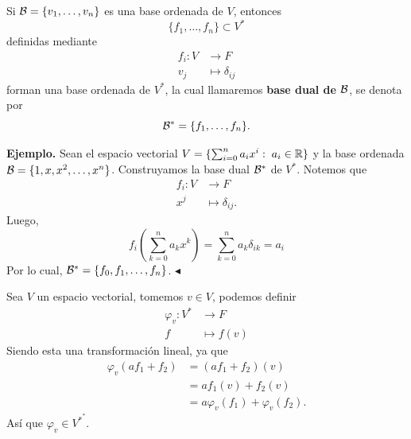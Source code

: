 \documentclass[12pt,a4paper]{book}
\newcommand{\llaves}[1]{\{#1\}}
\newcommand{\parentesis}[1]{\left(#1\right)}
\begin{document}
    \begin{definicion}
    \label{def:29}
        Si $\BB = \llaves{v_{1}, \dots, v_{n}}$ es una base ordenada de $V$, entonces
        \begin{equation*}
        \llaves{f_{1}, \dots, f_{n}} \subset V^{*}
        \end{equation*}
        definidas mediante
        \begin{align*}
            f_{i}: V & \longrightarrow F\\
            v_{j} & \longmapsto \delta_{ij}
        \end{align*}
        forman una base ordenada de $V^{*}$, la cual llamaremos \textbf{base dual de $\mathcal{B}$}, se denota por 
        \begin{equation*}
        \BB^{*} = \llaves{f_{1}, \dots, f_{n}}.
        \end{equation*}
    \end{definicion}
    
    \textbf{Ejemplo.} Sean el espacio vectorial $V = \llaves{\sum_{i = 0}^{n}a_{i}x^{i}:\; a_{i} \in \R}$ y la base ordenada $\BB = \llaves{1, x, x^{2}, \dots, x^{n}}$. Construyamos la base dual $\mathcal{B}^{*}$ de $V^{*}$. Notemos que
    \begin{align*}
        f_{i}: V & \longrightarrow F\\
        x^{j} & \longmapsto \delta_{ij}.
    \end{align*}
    Luego,
    \begin{equation*}
    f_{i}\parentesis{\sum_{k = 0}^{n}a_{k}x^{k}} = \sum_{k = 0}^{n}a_{k}\delta_{ik} = a_{i}
    \end{equation*}
    Por lo cual, $\BB^{*} = \llaves{f_{0}, f_{1}, \dots, f_{n}}$. \hfill $\blacktriangleleft$

    Sea $V$ un espacio vectorial, tomemos $v \in V$, podemos definir
    \begin{align*}
        \varphi_{v}: V^{*} & \longrightarrow F\\
        f & \longmapsto f(v)
    \end{align*}
    Siendo esta una transformación lineal, ya que
    \begin{align*}
        \varphi_{v}(af_{1} + f_{2}) & = (af_{1} + f_{2})(v)\\
        & = af_{1}(v) + f_{2}(v)\\
        & = a \varphi_{v}(f_{1}) + \varphi_{v}(f_{2}).
    \end{align*}
    Así que $\varphi_{v} \in V^{*^{*}}$.
\end{document}
